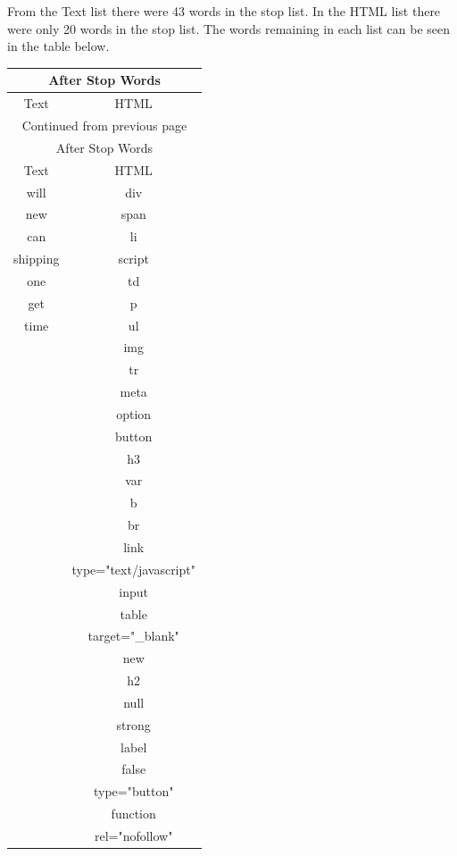 \documentclass[12pt]{article}
\begin{document}
From the Text list there were 43 words in the stop list.  In the HTML list there were only 20 words in the stop list.  The words remaining in each list can be seen in the table below.
\begin{longtable}{|c|c|}
    \hline
    \multicolumn{2}{|c|}{After Stop Words}\\
    \hline
    Text & HTML \\
    \hline
    \endfirsthead
    \multicolumn{2}{c}{Continued from previous page}\\
    \hline
    \multicolumn{2}{|c|}{After Stop Words}\\
    \hline
    Text & HTML \\
    \hline
    \endhead
    will & div\\
    \hline
    new & span\\
    \hline
    can & li\\
    \hline
    shipping & script\\
    \hline
    one & td\\
    \hline
    get & p\\
    \hline
    time & ul\\
    \hline
    & img\\
    \hline
    & tr\\
    \hline
    & meta\\
    \hline
    & option\\
    \hline
    & button\\
    \hline
    & h3\\
    \hline
    & var\\
    \hline
    & b\\
    \hline
    & br\\
    \hline
    & link\\
    \hline
    & type="text/javascript"\\
    \hline
    & input\\
    \hline
    & table\\
    \hline
    & target="\_blank"\\
    \hline
    & new\\
    \hline
    & h2\\
    \hline
    & null\\
    \hline
    & strong\\
    \hline
    & label\\
    \hline
    & false\\
    \hline
    & type="button"\\
    \hline
    & function\\
    \hline
    & rel="nofollow"\\
    \hline
\end{longtable}
\end{document}
